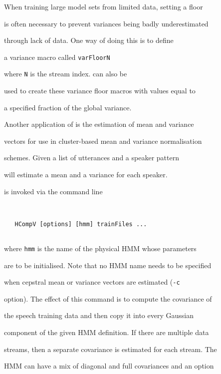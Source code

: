 When training large model sets from limited data, setting a floor


is often necessary to prevent variances being badly underestimated


through lack of data.  One way of doing this is to define


a variance macro called \texttt{varFloorN}


where \texttt{N} is the stream index.  can also be


used to create these variance floor macros with values equal to


a specified fraction of the global variance.





Another application of  is the estimation of mean and variance


vectors for use in cluster-based mean and variance normalisation


schemes. Given a list of utterances and a speaker pattern


 will estimate a mean and a variance for each speaker.










 is invoked via the command line


\begin{verbatim}


   HCompV [options] [hmm] trainFiles ...


\end{verbatim}


where \texttt{hmm} is the name of the physical HMM whose parameters


are to be initialised. Note that no HMM name needs to be specified


when cepstral mean or variance vectors are estimated (\texttt{-c}


option). The effect of this command is to compute the covariance of


the speech training data and then copy it into every Gaussian


component of the given HMM definition.  If there are multiple data


streams, then a separate covariance is estimated for each stream.  The


HMM can have a mix of diagonal and full covariances and an option


